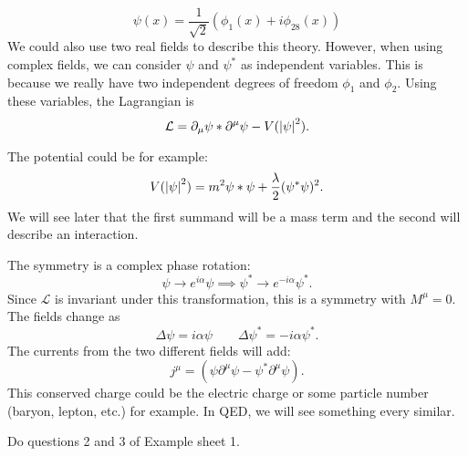 \begin{example}
  \begin{equation}
    \psi (x) = \frac{1}{\sqrt{2}} (\phi_1(x) + i \phi_{28}(x))
  \end{equation}
  We could also use two real fields to describe this theory. However, when using complex fields, we can consider $\psi$ and $\psi^*$ as independent variables. This is because we really have two independent degrees of freedom $\phi_1$ and $\phi_2$.
  Using these variables, the Lagrangian is
  \begin{equation}
    \mathcal{L} = \partial_\mu \psi* \partial^\mu \psi - V(\abs{\psi}^2).
  \end{equation}
  \begin{leftbar}
    \begin{remark}
      The potential could be for example:
      \begin{equation}
	V(\abs{\psi}^2) = m^2 \psi* \psi + \frac{\lambda}{2} (\psi^* \psi)^2.
      \end{equation}
      We will see later that the first summand will be a mass term and the second will describe an interaction.
    \end{remark}
  \end{leftbar}
  The symmetry is a complex phase rotation:
  \begin{equation}
    \psi \to e^{i\alpha} \psi \implies \psi^* \to e^{-i\alpha} \psi^*.
  \end{equation}
  Since $\mathcal{L}$ is invariant under this transformation, this is a symmetry with $M^\mu = 0$.
  The fields change as
  \begin{equation}
    \Delta \psi = i \alpha \psi \qquad \Delta \psi^* = -i \alpha \psi^*.
  \end{equation}
  The currents from the two different fields will add:
  \begin{equation}
    j^\mu = (\psi \partial^\mu \psi - \psi^* \partial^\mu \psi).
  \end{equation}
  This conserved charge could be the electric charge or some particle number (baryon, lepton, etc.) for example. In QED, we will see something every similar.
\end{example} 

\begin{example}
Do questions 2 and 3 of Example sheet 1.
\end{example}
